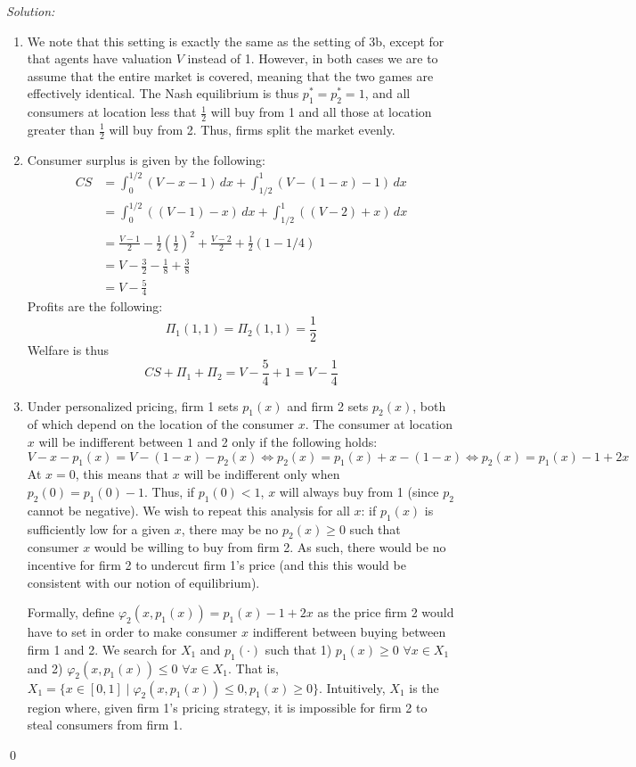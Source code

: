 \documentclass[12pt]{article}
\newenvironment{sol}
    {\emph{Solution:}
    }
    {
    \qed
    }
\begin{document}
\begin{sol}
    \begin{enumerate}[label=\alph*) ]
        \item We note that this setting is exactly the same as the setting of 3b, except for that agents have valuation $V$ instead of 1. However, in both cases we are to assume that the entire market is covered, meaning that the two games are effectively identical. The Nash equilibrium is thus $p_1^* = p_2^* = 1$, and all consumers at location less that $\frac{1}{2}$ will buy from 1 and all those at location greater than $\frac{1}{2}$ will buy from 2. Thus, firms split the market evenly.
        \item Consumer surplus is given by the following:
        \begin{align*}CS &= \int_{0}^{1/2} (V - x - 1) \, dx + \int_{1/2}^{1} (V - (1-x) - 1) \, dx\\
            &= \int_{0}^{1/2} ((V-1) - x ) \, dx + \int_{1/2}^{1} ((V -2) + x) \, dx\\
            &= \frac{V-1}{2} - \frac{1}{2}\left(\frac{1}{2}\right)^2 + \frac{V-2}{2} + \frac{1}{2}(1 - 1/4)\\
            &= V - \frac{3}{2} - \frac{1}{8} + \frac{3}{8}\\
            &= V - \frac{5}{4}
        \end{align*}
        Profits are the following:
        \[\Pi_1(1,1) = \Pi_2(1,1) = \frac{1}{2} \]
        Welfare is thus
        \[CS + \Pi_1 + \Pi_2 = V - \frac{5}{4} + 1 = V - \frac{1}{4}\]
        \item Under personalized pricing, firm 1 sets $p_1(x)$ and firm 2 sets $p_2(x)$, both of which depend on the location of the consumer $x$. The consumer at location $x$ will be indifferent between $1$ and 2 only if the following holds:
        \[V - x - p_1(x) = V - (1-x) - p_2(x) \iff p_2(x) = p_1(x) + x - (1-x) \iff p_2(x) = p_1(x) -1 + 2x\]
        At $x = 0$, this means that $x$ will be indifferent only when $p_2(0) = p_1(0) - 1$. Thus, if $p_1(0) < 1$, $x$ will always buy from 1 (since $p_2$ cannot be negative). We wish to repeat this analysis for all $x$: if $p_1(x)$ is sufficiently low for a given $x$, there may be no $p_2(x) \geq 0$ such that consumer $x$ would be willing to buy from firm 2. As such, there would be no incentive for firm 2 to undercut firm 1's price (and this this would be consistent with our notion of equilibrium).

        Formally, define $\varphi_2(x, p_1(x)) = p_1(x) - 1 + 2x$ as the price firm 2 would have to set in order to make consumer $x$ indifferent between buying between firm 1 and 2. We search for $X_1$ and $p_1(\cdot)$ such that 1) $p_1(x) \geq 0$ $\forall x \in X_1$ and 2) $\varphi_2(x, p_1(x)) \leq 0$ $\forall x \in X_1$. That is, $X_1 = \{x \in [0,1] \mid \varphi_2(x, p_1(x)) \leq 0, p_1(x) \geq 0\}$. Intuitively, $X_1$ is the region where, given firm 1's pricing strategy, it is impossible for firm 2 to steal consumers from firm 1.


\end{enumerate}
\end{sol}
\end{document}
